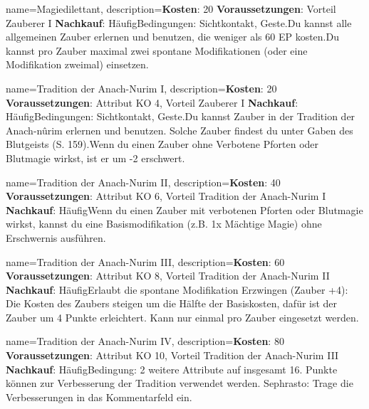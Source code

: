 {
    name={Magiedilettant},
    description={\textbf{Kosten}: 20 \textbf{Voraussetzungen}: Vorteil Zauberer I \textbf{Nachkauf}: Häufig\newline Bedingungen: Sichtkontakt, Geste.\newline Du kannst alle allgemeinen Zauber erlernen und benutzen, die weniger als 60 EP kosten.\newline Du kannst pro Zauber maximal zwei spontane Modifikationen (oder eine Modifikation zweimal) einsetzen.}
}


{
    name={Tradition der Anach-Nurim I},
    description={\textbf{Kosten}: 20 \textbf{Voraussetzungen}: Attribut KO 4, Vorteil Zauberer I \textbf{Nachkauf}: Häufig\newline Bedingungen: Sichtkontakt, Geste.\newline Du kannst Zauber in der Tradition der Anach-nûrim erlernen und benutzen. Solche Zauber findest du unter Gaben des Blutgeists (S. 159).\newline Wenn du einen Zauber ohne Verbotene Pforten oder Blutmagie wirkst, ist er um -2 erschwert.}
}


{
    name={Tradition der Anach-Nurim II},
    description={\textbf{Kosten}: 40 \textbf{Voraussetzungen}: Attribut KO 6, Vorteil Tradition der Anach-Nurim I \textbf{Nachkauf}: Häufig\newline Wenn du einen Zauber mit verbotenen Pforten oder Blutmagie wirkst, kannst du eine Basismodifikation (z.B. 1x Mächtige Magie) ohne Erschwernis ausführen.}
}


{
    name={Tradition der Anach-Nurim III},
    description={\textbf{Kosten}: 60 \textbf{Voraussetzungen}: Attribut KO 8, Vorteil Tradition der Anach-Nurim II \textbf{Nachkauf}: Häufig\newline Erlaubt die spontane Modifikation Erzwingen (Zauber +4): Die Kosten des Zaubers steigen um die Hälfte der Basiskosten, dafür ist der Zauber um 4 Punkte erleichtert. Kann nur einmal pro Zauber eingesetzt werden.}
}


{
    name={Tradition der Anach-Nurim IV},
    description={\textbf{Kosten}: 80 \textbf{Voraussetzungen}: Attribut KO 10, Vorteil Tradition der Anach-Nurim III \textbf{Nachkauf}: Häufig\newline Bedingung: 2 weitere Attribute auf insgesamt 16. Punkte können zur Verbesserung der Tradition verwendet werden. Sephrasto: Trage die Verbesserungen in das Kommentarfeld ein.}
}


